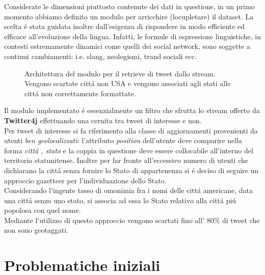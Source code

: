 \documentclass[twocolumn,10pt]{asme2ej}
\begin{document}
Considerate le dimensioni piuttosto contenute dei dati in questione, in un primo momento abbiamo definito un modulo per arricchire (locupletare) il dataset. La scelta \'e stata guidata inoltre dall'esigenza di rispondere in modo efficiente ed efficace all'evoluzione della lingua. Infatti, le formule di espressione linguistiche, in contesti estremamente dinamici come quelli dei social network, sono soggette a continui cambiamenti: i.e. slang, neologismi, trand sociali ecc.
\begin{figure} 
\centerline{}
\caption{Architettura del modulo per il retrieve di tweet dallo stream. Vengono scartate citt\'a non USA e vengono associati agli stati alle citt\'a non correttamente formattate.}
\label{gazproc.ps}
\end{figure}


 
Il modulo implementato \'e essenzialmente un filtro che sfrutta lo stream offerto da \textbf{Twitter4j} effettuando una cernita tra tweet di interesse e non.\\ Per tweet di interesse si fa riferimento alla classe di aggiornamenti provenienti da utenti \textit{ben geolocalizzati}: l'attributo \textit{position} dell'utente deve comparire nella forma \textit{citt\'a , stato} e la coppia in questione deve essere collocabile all'interno del territorio statunitense. Inoltre per far fronte all'eccessivo numero di utenti che  dichiarano la citt\'a senza fornire lo Stato di appartenenza si \'e deciso di seguire un approccio gazetteer per l'individuazione dello Stato.\\ Considerando l'ingente tasso di omonimia fra i nomi delle citt\'a americane, data una citt\'a senzo uno stato, si associa ad essa lo Stato relativo alla citt\'a pi\'u popolosa con quel nome. \\Mediante l'utilizzo di questo approccio vengono scartati fino all' $80\%$ di tweet che non sono geotaggati. 


\section{Problematiche  iniziali}
\end{document}
